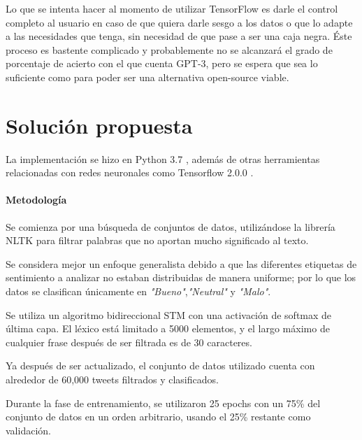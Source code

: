 \documentclass[a4]{sciposter}
\begin{document}
\begin{multicols}{3}
Lo que se intenta hacer al momento de utilizar TensorFlow es darle el control completo al usuario en caso de que quiera darle sesgo a los datos o que lo adapte a las necesidades que tenga, sin necesidad de que pase a ser una caja negra. Éste proceso es bastente complicado y probablemente no se alcanzará el grado de porcentaje de acierto con el que cuenta GPT-3, pero se espera que sea lo suficiente como para poder ser una alternativa open-source viable.



\section{Solución propuesta}
La implementación se hizo en Python 3.7 \citep{python}, además de otras herramientas relacionadas con redes neuronales como Tensorflow 2.0.0 \citep{tensorflow}.


\paragraph{Metodología}
Se comienza por una búsqueda de conjuntos de datos, utilizándose la librería NLTK \citep{nltk} para filtrar palabras que no aportan mucho significado al texto.

Se considera mejor un enfoque generalista debido a que las diferentes etiquetas de sentimiento a analizar no estaban distribuidas de manera uniforme; por lo que los datos se clasifican únicamente en \textit{"Bueno"},\textit{"Neutral"} y \textit{"Malo"}.

Se utiliza un algoritmo bidireccional STM con una activación de softmax de última capa. El léxico está limitado a 5000 elementos, y el largo máximo de cualquier frase después de ser filtrada es de 30 caracteres.

Ya después de ser actualizado, el conjunto de datos utilizado cuenta con alrededor de 60,000 tweets filtrados y clasificados.

Durante la fase de entrenamiento, se utilizaron 25 epochs con un 75\% del conjunto de datos en un orden arbitrario, usando el 25\% restante como validación.


\end{multicols}
\end{document}
